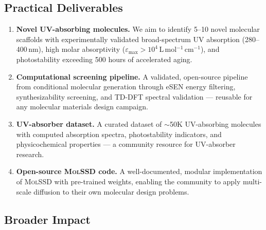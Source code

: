 \documentclass[11pt,a4paper]{article}
\newcommand{\molssd}{\textsc{MolSSD}}
\begin{document}
\subsection{Practical Deliverables}

\begin{enumerate}[leftmargin=*]
  \item \textbf{Novel UV-absorbing molecules.}
    We aim to identify 5--10 novel molecular scaffolds with experimentally validated
    broad-spectrum UV absorption (280--400\,nm), high molar absorptivity
    ($\varepsilon_\text{max} > 10^4$\,L\,mol$^{-1}$\,cm$^{-1}$), and photostability
    exceeding 500 hours of accelerated aging.

  \item \textbf{Computational screening pipeline.}
    A validated, open-source pipeline from conditional molecular generation through
    eSEN energy filtering, synthesizability screening, and TD-DFT spectral
    validation --- reusable for any molecular materials design campaign.

  \item \textbf{UV-absorber dataset.}
    A curated dataset of $\sim$50K UV-absorbing molecules with computed absorption
    spectra, photostability indicators, and physicochemical properties --- a community
    resource for UV-absorber research.

  \item \textbf{Open-source \molssd{} code.}
    A well-documented, modular implementation of \molssd{} with pre-trained weights,
    enabling the community to apply multi-scale diffusion to their own molecular
    design problems.
\end{enumerate}

\subsection{Broader Impact}
\end{document}
